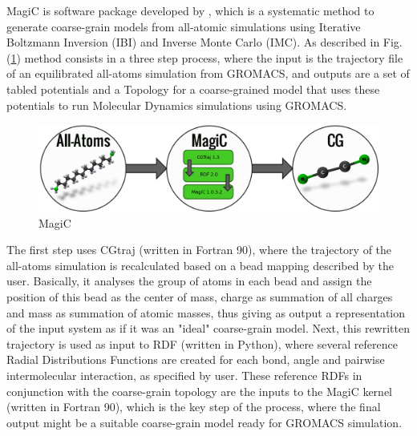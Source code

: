 \documentclass[10pt,a4paper,twoside]{article}
\begin{document}
MagiC is software package developed by , which is a systematic method to generate coarse-grain models from all-atomic simulations using Iterative Boltzmann Inversion (IBI) and Inverse Monte Carlo (IMC). As described in Fig.(\ref{Fig:magic}) method consists in a three step process, where the input is the trajectory file of an equilibrated all-atoms simulation from GROMACS, and outputs are a set of tabled potentials and a Topology for a coarse-grained model that uses these potentials to run Molecular Dynamics simulations using GROMACS. 
 \begin{figure}[ht]
  \begin{center}
	\includegraphics[width=1 \textwidth]{./images/magic}
	\caption{MagiC}
	\label{Fig:magic}
	\end{center}
	\end{figure}

 The first step uses CGtraj (written in Fortran 90), where the trajectory of the all-atoms simulation is recalculated based on a bead mapping described by the user. Basically, it analyses the group of atoms in each bead and assign the position of this bead as the center of mass, charge as summation of all charges and mass as summation of atomic masses, thus giving as output a representation of the input system as if it was an "ideal" coarse-grain model. Next, this rewritten trajectory is used as input to RDF (written in Python), where several reference Radial Distributions Functions are created for each bond, angle and pairwise intermolecular interaction, as specified by user. These reference RDFs in conjunction with the coarse-grain topology are the  inputs to the MagiC kernel (written in Fortran 90), which is the key step of the process, where the final output might be a suitable coarse-grain model ready for GROMACS simulation.
 
\end{document}
